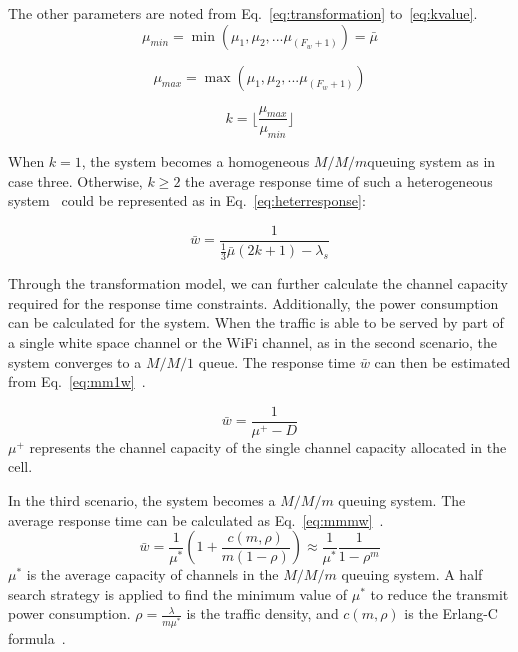 The other parameters are noted from Eq.~\ref{eq:transformation} to~\ref{eq:kvalue}.
\begin{equation}
\label{eq:transformation}
\mu_{min}=\min{(\mu_1,\mu_2,...\mu_{(F_w+1)})} = \bar{\mu}
\end{equation}

\begin{equation}
\mu_{max}=\max{(\mu_1,\mu_2,...\mu_{(F_w+1)})} 
\end{equation}

\begin{equation}
\label{eq:kvalue}
k= \lfloor\frac{\mu_{max}}{\mu_{min}} \rfloor
\end{equation}

When $k=1$, the system becomes a homogeneous $M/M/m$queuing system as in case three. Otherwise,   
$k\ge2$ the average response time of such a heterogeneous system~\cite{yu2008transformation} 
could be represented as in Eq.~\ref{eq:heterresponse}:

\begin{equation}
\label{eq:heterresponse}
\bar{w}=\frac{1}{\frac{1}{3}\bar{\mu}(2k+1)-\lambda_s}
\end{equation}

Through the transformation model, we can further calculate the channel capacity required for the response time constraints. 
Additionally, the power consumption can be calculated for the system.
When the traffic is able to be served by part of a single white space channel or the WiFi channel, as in
the second scenario, the system converges to a $M/M/1$ queue. The response time $\bar{w}$ 
can then be estimated from Eq.~\ref{eq:mm1w}~\cite{gelenbe1998introduction}.

\begin{equation}
\label{eq:mm1w}
\bar{w}=\frac{1}{\mu^+-D}
\end{equation}
$\mu^+$ represents the channel capacity of the single channel capacity allocated in the cell.

In the third scenario, the system becomes a $M/M/m$ queuing system. 
The average response time can be calculated as Eq.~\ref{eq:mmmw}~\cite{gelenbe1998introduction}.
\begin{equation}
\label{eq:mmmw}
\bar{w} = \frac{1}{\mu^*}(1+\frac{c(m,\rho)}{m(1-\rho)})\approx \frac{1}{\mu^*}\frac{1}{1-\rho^m}
\end{equation}
$\mu^*$ is the average capacity of channels in the $M/M/m$ queuing system.
A half search strategy is applied to find the minimum value of $\mu^*$ to reduce the transmit power
consumption.
$\rho=\frac{\lambda}{m\mu^*}$ is the traffic density, and $c(m,\rho)$ is the Erlang-C 
formula~\cite{gelenbe1998introduction}.


